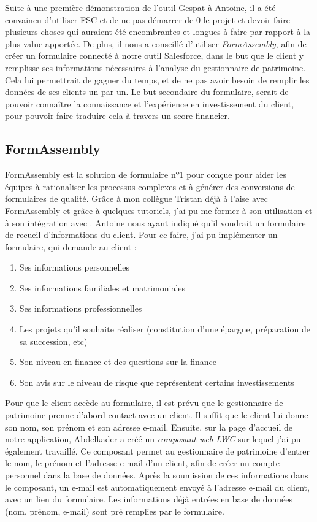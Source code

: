\documentclass[12pt,oneside,noprintercorrection]{iut}
\begin{document}
Suite à une première démonstration de l'outil Gespat à Antoine, il a été convaincu d'utiliser FSC et de ne pas démarrer de 0 le projet et devoir faire plusieurs choses qui auraient été encombrantes et longues à faire par rapport à la plus-value apportée. De plus, il nous a conseillé d'utiliser \textit{FormAssembly}, afin de créer un formulaire connecté à notre outil Salesforce, dans le but que le client y remplisse ses informations nécessaires à l'analyse du gestionnaire de patrimoine. Cela lui permettrait de gagner du temps, et de ne pas avoir besoin de remplir les données de ses clients un par un. Le but secondaire du formulaire, serait de pouvoir connaître la connaissance et l'expérience en investissement du client, pour pouvoir faire traduire cela à travers un score financier.

\subsection{FormAssembly}
FormAssembly est la solution de formulaire nº1 pour \slf{} conçue pour aider les équipes à rationaliser les processus complexes et à générer des conversions de formulaires de qualité.
Grâce à mon collègue Tristan déjà à l'aise avec FormAssembly et grâce à quelques tutoriels, j'ai pu me former à son utilisation et à son intégration avec \slf{}. Antoine nous ayant indiqué qu'il voudrait un formulaire de recueil d'informations du client. Pour ce faire, j'ai pu implémenter un formulaire, qui demande au client :
\begin{enumerate}
    \item Ses informations personnelles
    \item Ses informations familiales et matrimoniales
    \item Ses informations professionnelles
    \item Les projets qu'il souhaite réaliser (constitution d'une épargne, préparation de sa succession, etc)
    \item Son niveau en finance et des questions sur la finance
    \item Son avis sur le niveau de risque que représentent certains investissements
\end{enumerate}

Pour que le client accède au formulaire, il est prévu que le gestionnaire de patrimoine prenne d'abord contact avec un client. Il suffit que le client lui donne son nom, son prénom et son adresse e-mail. Ensuite, sur la page d'accueil de notre application, Abdelkader a créé un \textit{composant web LWC} sur lequel j'ai pu également travaillé. Ce composant permet au gestionnaire de patrimoine d'entrer le nom, le prénom et l'adresse e-mail d'un client, afin de créer un compte personnel dans la base de données. Après la soumission de ces informations dans le composant, un e-mail est automatiquement envoyé à l'adresse e-mail du client, avec un lien du formulaire. Les informations déjà entrées en base de données (nom, prénom, e-mail) sont pré remplies par le formulaire.
\end{document}
